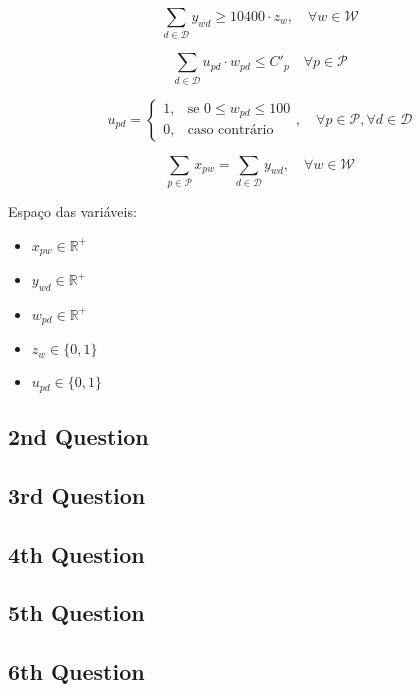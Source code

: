 \documentclass[12pt,a4paper]{article}
\begin{document}
\begin{equation} %
    \sum_{d \in \mathcal{D}} y_{wd}
    \geq 10400 \cdot z_{w}, \quad
    \forall w \in \mathcal{W}
\end{equation}


\begin{equation} %
    \sum_{d \in \mathcal{D}} u_{pd} \cdot w_{pd} \leq C'_p \quad \forall p \in \mathcal{P}
\end{equation}

\begin{equation}%
    u_{pd} =
    \begin{cases}
        1, & \text{se } 0 \leq w_{pd} \leq 100 \\
        0, & \text{caso contrário}
    \end{cases}, \quad \forall p \in \mathcal{P}, \forall d \in \mathcal{D}
\end{equation}


\begin{equation} %
    \sum_{p \in \mathcal{P}} x_{pw} =
    \sum_{d \in \mathcal{D}} y_{wd}, \quad
    \forall w \in \mathcal{W}
\end{equation}

Espaço das variáveis:

\begin{itemize}
    \item $x_{pw} \in \mathbb{R}^+$
    \item $y_{wd} \in \mathbb{R}^+$
    \item $w_{pd} \in \mathbb{R}^+$
    \item $z_{w} \in \{0, 1\}$
    \item $u_{pd} \in \{0, 1\}$
\end{itemize}




\subsection{2nd Question}
\cite{states_centers}
\cite{ballou}

\subsection{3rd Question}


\subsection{4th Question}


\subsection{5th Question}


\subsection{6th Question}



\end{document}
